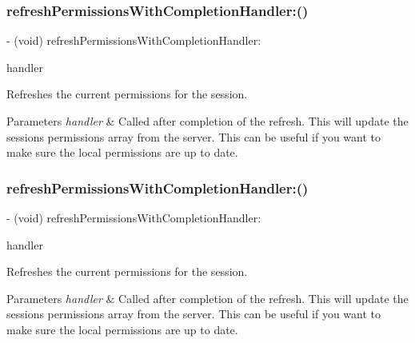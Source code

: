 \subsubsection{\texorpdfstring{refresh\+Permissions\+With\+Completion\+Handler\+:()}{refreshPermissionsWithCompletionHandler:()}\hspace{0.1cm}{\footnotesize\ttfamily [4/5]}}
{\footnotesize\ttfamily -\/ (void) refresh\+Permissions\+With\+Completion\+Handler\+: \begin{DoxyParamCaption}\item[{(F\+B\+Session\+Request\+Permission\+Result\+Handler)}]{handler }\end{DoxyParamCaption}}

Refreshes the current permissions for the session. 
\begin{DoxyParams}{Parameters}
{\em handler} & Called after completion of the refresh.  This will update the sessions\textquotesingle{} permissions array from the server. This can be useful if you want to make sure the local permissions are up to date. \\
\hline
\end{DoxyParams}
\mbox{\label{interfaceFBSession_a569f5daa686e4593bd0d5e68016a15a0}} 
\subsubsection{\texorpdfstring{refresh\+Permissions\+With\+Completion\+Handler\+:()}{refreshPermissionsWithCompletionHandler:()}\hspace{0.1cm}{\footnotesize\ttfamily [5/5]}}
{\footnotesize\ttfamily -\/ (void) refresh\+Permissions\+With\+Completion\+Handler\+: \begin{DoxyParamCaption}\item[{(F\+B\+Session\+Request\+Permission\+Result\+Handler)}]{handler }\end{DoxyParamCaption}}

Refreshes the current permissions for the session. 
\begin{DoxyParams}{Parameters}
{\em handler} & Called after completion of the refresh.  This will update the sessions\textquotesingle{} permissions array from the server. This can be useful if you want to make sure the local permissions are up to date. \\
\hline
\end{DoxyParams}
\mbox{\label{interfaceFBSession_a3b4d7c16af36ea5690d19bf77065dfaf}} 
